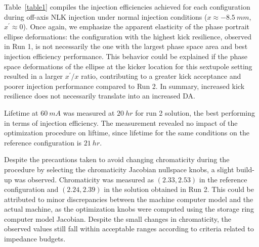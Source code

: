 Table~\ref{table1} compiles the injection efficiencies achieved for each configuration during off-axis NLK injection under normal injection conditions ($x\approx -8.5~\unit{mm}$, $x^\prime\approx 0 $).
Once again, we emphasize the apparent elasticity of the phase portrait ellipse deformations: the configuration with the highest kick resilience, observed in Run 1, is not necessarily the one with the largest phase space area and best injection efficiency performance. This behavior could be explained if the phase space deformations of the ellipse at the kicker location for this sextupole setting resulted in a larger $x^\prime/x$ ratio, contributing to a greater kick acceptance and poorer injection performance compared to Run 2. In summary, increased kick resilience does not necessarily translate into an increased DA.

Lifetime at $60~\unit{mA}$ was measured at $20~\unit{hr}$ for run 2 solution, the best performing in terms of injection efficiency. The measurement revealed no impact of the optimization procedure on liftime, since lifetime for the same conditions on the reference configuration is $21~\unit{hr}$.

Despite the precautions taken to avoid changing chromaticity during the procedure by selecting the chromaticity Jacobian nullspace knobs, a slight build-up was observed. Chromaticity was measured as $(2.33, 2.53)$ in the reference configuration and $(2.24, 2.39)$ in the solution obtained in Run 2. This could be attributed to minor discrepancies between the machine computer model and the actual machine, as the optimization knobs were computed using the storage ring computer model Jacobian. Despite the small changes in chromaticity, the observed values still fall within acceptable ranges according to criteria related to impedance budgets.

